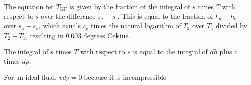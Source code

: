 The equation for \( T_{\text{KF}} \) is given by the fraction of the integral of \( s \) times \( T \) with respect to \( s \) over the difference \( s_a - s_e \). This is equal to the fraction of \( h_a - h_e \) over \( s_a - s_e \), which equals \( c_p \) times the natural logarithm of \( T_2 \) over \( T_1 \) divided by \( T_2 - T_1 \), resulting in \( 0.003 \) degrees Celsius.

The integral of \( s \) times \( T \) with respect to \( s \) is equal to the integral of \( dh \) plus \( v \) times \( dp \).

For an ideal fluid, \( v dp = 0 \) because it is incompressible.